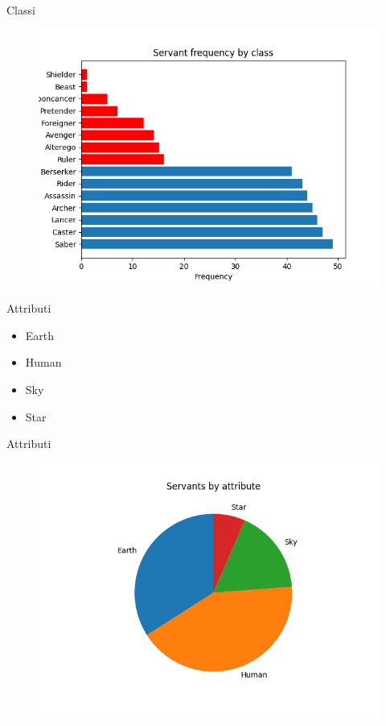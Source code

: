 \documentclass{beamer}
\begin{document}
\begin{darkframes}
  \begin{frame}{Classi}
    \begin{figure}
      \centering
      \includegraphics[scale=0.5]{./images/frequency_by_class.png}
    \end{figure}
  \end{frame}

  \begin{frame}{Attributi}
    \begin{itemize}
      \item Earth
      \item Human
      \item Sky
      \item Star
    \end{itemize}
  \end{frame}

  \begin{frame}{Attributi}
    \begin{figure}
      \centering
      \includegraphics[scale=0.5]{./images/frequency_by_attribute.png}
    \end{figure}
  \end{frame}


\end{darkframes}
\end{document}
